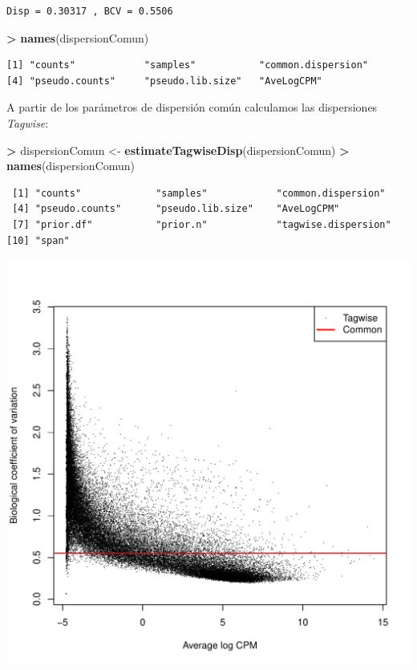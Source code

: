 \documentclass[
  english,
]{article}
\newenvironment{Shaded}{\begin{snugshade}}{\end{snugshade}}
\newcommand{\KeywordTok}[1]{\textcolor[rgb]{0.13,0.29,0.53}{\textbf{#1}}}
\newcommand{\NormalTok}[1]{#1}
\newcommand{\OperatorTok}[1]{\textcolor[rgb]{0.81,0.36,0.00}{\textbf{#1}}}
\newcommand{\StringTok}[1]{\textcolor[rgb]{0.31,0.60,0.02}{#1}}
\begin{document}
\begin{verbatim}
Disp = 0.30317 , BCV = 0.5506 
\end{verbatim}

\begin{Shaded}
\begin{Highlighting}[]
\OperatorTok{>}\StringTok{ }\KeywordTok{names}\NormalTok{(dispersionComun)}
\end{Highlighting}
\end{Shaded}

\begin{verbatim}
[1] "counts"            "samples"           "common.dispersion"
[4] "pseudo.counts"     "pseudo.lib.size"   "AveLogCPM"        
\end{verbatim}

A partir de los parámetros de dispersión común calculamos las
dispersiones \emph{Tagwise}:

\begin{Shaded}
\begin{Highlighting}[]
\OperatorTok{>}\StringTok{ }\NormalTok{dispersionComun <-}\StringTok{ }\KeywordTok{estimateTagwiseDisp}\NormalTok{(dispersionComun)}
\OperatorTok{>}\StringTok{ }\KeywordTok{names}\NormalTok{(dispersionComun)}
\end{Highlighting}
\end{Shaded}

\begin{verbatim}
 [1] "counts"             "samples"            "common.dispersion" 
 [4] "pseudo.counts"      "pseudo.lib.size"    "AveLogCPM"         
 [7] "prior.df"           "prior.n"            "tagwise.dispersion"
[10] "span"              
\end{verbatim}

\includegraphics{ortega_rita_ADO_PEC2_files/figure-latex/plotBCV-1.pdf}
\end{document}
